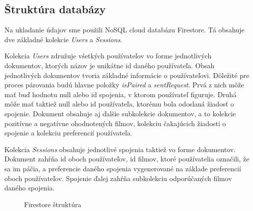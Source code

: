 \subsection{Štruktúra databázy}
Na ukladanie údajov sme použili NoSQL cloud databázu Firestore. Tá obsahuje dve základné kolekcie \textit{Users} a  \textit{Sessions}. 

Kolekcia \textit{Users} združuje všetkých používateľov vo forme jednotlivých dokumentov, ktorých názov je unikátne id daného používateľa. Obsah jednotlivých dokumentov tvoria základné informácie o používateľovi. Dôležité pre proces párovania budú hlavne položky \textit{isPaired} a \textit{sentRequest}. Prvá z nich môže mať buď hodnotu null alebo id spojenia, v ktorom používateľ figuruje. Druhá môže mať taktiež null alebo id používateľa, ktorému bola odoslaná žiadosť o spojenie. Dokument obsahuje aj ďalšie subkolekcie dokumentov, a to kolekcie pozitívne a negatívne ohodnotených filmov, kolekciu čakajúcich žiadosti o spojenie a kolekciu preferencií používateľa.

Kolekcia \textit{Sessions} obsahuje jednotlivé spojenia taktiež vo forme dokumentov. Dokument zahŕňa id oboch používateľov, id filmov, ktoré používatelia označili, že sa im páčia, a preferencie daného spojenia vygenerované na základe preferencií oboch používateľov. Spojenie ďalej zahŕňa subkolekciu odporúčaných filmov daného spojenia. 
\vspace{55mm}

\begin{figure}[hbt!]
  \centering   
  \def\stackalignment{c}
           \scriptsize
	\caption{Firestore štruktúra}  
  \label{dbstructure}
\end{figure}

